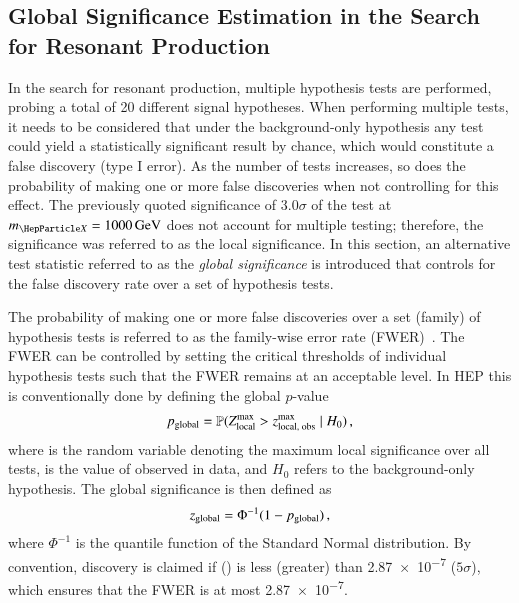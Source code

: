 

\subsection{Global Significance Estimation in the Search for Resonant \HH
  Production}%
\label{sec:global_significance}

In the search for resonant \HH production, multiple hypothesis tests are
performed, probing a total of 20 different signal hypotheses. When performing
multiple tests, it needs to be considered that under the background-only
hypothesis any test could yield a statistically significant result by chance,
which would constitute a false discovery (type I error). As the number of tests
increases, so does the probability of making one or more false discoveries when
not controlling for this effect. The previously quoted significance of
$3.0\sigma$ of the test at $\mX = \SI{1000}{\GeV}$ does not account for multiple
testing; therefore, the significance was referred to as the local
significance. In this section, an alternative test statistic referred to as the
\emph{global significance} is introduced that controls for the false discovery
rate over a set of hypothesis tests.

The probability of making one or more false discoveries over a set (family) of
hypothesis tests is referred to as the family-wise error rate
(FWER)~\cite{lehmann2005testing}. The FWER can be controlled by setting the
critical thresholds of individual hypothesis tests such that the FWER remains at
an acceptable level. In HEP this is conventionally done by defining the global
$p$-value
\begin{align*}
  p_{\text{global}} = \mathbb{P}( Z_{\text{local}}^{\text{max}} > z_{\text{local, obs}}^{\text{max}} \mid H_0 )\,\text{,}
\end{align*}
where \Zmaxlocal is the random variable denoting the maximum local significance
over all tests, \zmaxlocalobs is the value of \Zmaxlocal observed in data, and
$H_0$ refers to the background-only hypothesis. The global significance is then
defined as
\begin{align*}
  z_{\text{global}} = \Phi^{-1}(1 - p_{\text{global}}) \,\text{,}
\end{align*}
where $\Phi^{-1}$ is the quantile function of the Standard Normal
distribution. By convention, discovery is claimed if \pglobal (\zglobal) is less
(greater) than \num{2.87e-7} ($5\sigma$), which ensures that the FWER is at most
\num{2.87e-7}.

